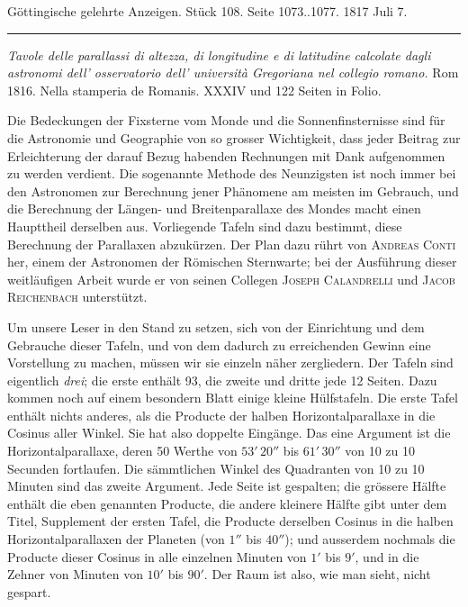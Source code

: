 \clearpage
{}
\hypertarget{native-604-lower}{}
\begin{center}\small Göttingische gelehrte Anzeigen. Stück 108. Seite 1073..1077. 1817 Juli 7.\\[3pt]\rule{.72\linewidth}{.3pt}\end{center}

\emph{Tavole delle parallassi di altezza, di longitudine e di latitudine calcolate dagli astronomi dell' osservatorio dell' università Gregoriana nel collegio romano.} Rom 1816. Nella stamperia de Romanis. XXXIV und 122 Seiten in Folio.

Die Bedeckungen der Fixsterne vom Monde und die Sonnenfinsternisse sind für die Astronomie und Geographie von so grosser Wichtigkeit, dass jeder Beitrag zur Erleichterung der darauf Bezug habenden Rechnungen mit Dank aufgenommen zu werden verdient. Die sogenannte Methode des Neunzigsten ist noch immer bei den Astronomen zur Berechnung jener Phänomene am meisten im Gebrauch, und die Berechnung der Längen- und Breitenparallaxe des Mondes macht einen Haupttheil derselben aus. Vorliegende Tafeln sind dazu bestimmt, diese Berechnung der Parallaxen abzukürzen. Der Plan dazu rührt von \textsc{Andreas Conti} her, einem der Astronomen der Römischen Sternwarte; bei der Ausführung dieser weitläufigen Arbeit wurde er von seinen Collegen \textsc{Joseph Calandrelli} und \textsc{Jacob Reichenbach} unterstützt.

Um unsere Leser in den Stand zu setzen, sich von der Einrichtung und dem Gebrauche dieser Tafeln, und von dem dadurch zu erreichenden Gewinn eine Vorstellung zu machen, müssen wir sie einzeln näher zergliedern. Der Tafeln sind eigentlich \emph{drei}; die erste enthält 93, die zweite und dritte jede 12 Seiten. Dazu kommen noch auf einem besondern Blatt einige kleine Hülfstafeln. Die erste Tafel enthält nichts anderes, als die Producte der halben Horizontalparallaxe in die Cosinus aller Winkel. Sie hat also doppelte Eingänge. Das eine Argument ist die Horizontalparallaxe, deren 50 Werthe von $53'\,20''$ bis $61'\,30''$ von 10 zu 10 Secunden fortlaufen. Die sämmtlichen Winkel des Quadranten von 10 zu 10 Minuten sind das zweite Argument. Jede Seite ist gespalten; die grössere Hälfte enthält die eben genannten Producte, die andere kleinere Hälfte gibt unter dem Titel, Supplement der ersten Tafel, die Producte derselben Cosinus in die halben Horizontalparallaxen der Planeten (von $1''$ bis $40''$); und ausserdem nochmals die Producte dieser Cosinus in alle einzelnen Minuten von $1'$ bis $9'$, und in die Zehner von Minuten von $10'$ bis $90'$. Der Raum ist also, wie man sieht, nicht gespart.

